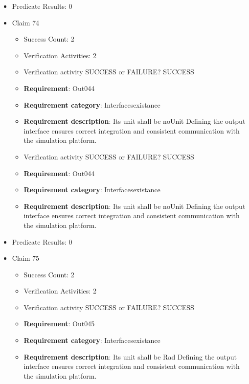 \documentclass{article}
\begin{document}
\begin{itemize}
\begin{itemize}
				\end{itemize}
				
									    
				\item Predicate Results: 0

  				  \item Claim 74
				\begin{itemize}
			    	\item Success Count: 2 
			    	\item Verification Activities: 2
					\item Verification activity SUCCESS or FAILURE? SUCCESS
		
						\item \textbf{Requirement}: Out044 
						\item \textbf{Requirement category}: Interfacesexistance 
						\item \textbf{Requirement description}: Its unit shall be noUnit Defining the output interface ensures correct integration and consistent communication with the simulation platform.
					
					\item Verification activity SUCCESS or FAILURE? SUCCESS
		
						\item \textbf{Requirement}: Out044 
						\item \textbf{Requirement category}: Interfacesexistance 
						\item \textbf{Requirement description}: Its unit shall be noUnit Defining the output interface ensures correct integration and consistent communication with the simulation platform.
					
				\end{itemize}
				
									    
				\item Predicate Results: 0

  				  \item Claim 75
				\begin{itemize}
			    	\item Success Count: 2 
			    	\item Verification Activities: 2
					\item Verification activity SUCCESS or FAILURE? SUCCESS
		
						\item \textbf{Requirement}: Out045 
						\item \textbf{Requirement category}: Interfacesexistance 
						\item \textbf{Requirement description}: Its unit shall be Rad Defining the output interface ensures correct integration and consistent communication with the simulation platform.
					

\end{itemize}
\end{itemize}
\end{document}
